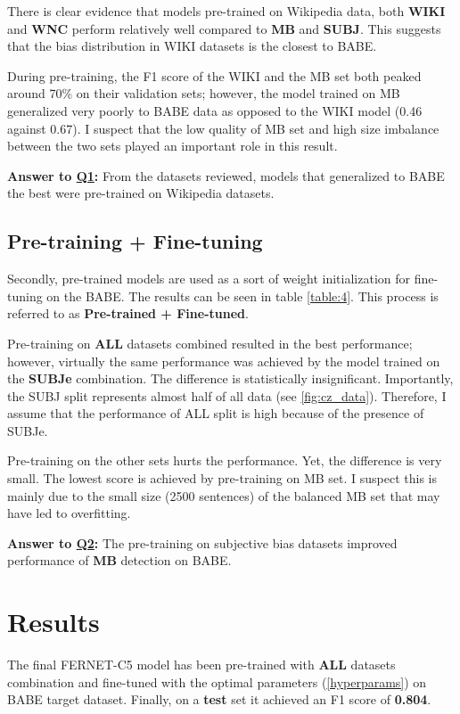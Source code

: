 There is clear evidence that models pre-trained on Wikipedia data, both \textbf{WIKI} and \textbf{WNC} perform relatively well compared to \textbf{MB} and \textbf{SUBJ}. This suggests that the bias distribution in WIKI datasets is the closest to BABE.

During pre-training, the F1 score of the WIKI and the MB set both peaked around 70\% on their validation sets; however, the model trained on MB generalized very poorly to BABE data as opposed to the WIKI model (0.46 against 0.67). I suspect that the low quality of MB set and high size imbalance between the two sets played an important role in this result.

\vspace{5mm}

\noindent \textbf{Answer to \hyperref[Q1]{Q1}:}
From the datasets reviewed, models that generalized to BABE the best were pre-trained on Wikipedia datasets.

\subsection{Pre-training + Fine-tuning}
Secondly, pre-trained models are used as a sort of weight initialization for fine-tuning on the BABE. The results can be seen in table \ref{table:4}. This process is referred to as \textbf{Pre-trained + Fine-tuned}.

Pre-training on \textbf{ALL} datasets combined resulted in the best performance; however, virtually the same performance was achieved by the model trained on the \textbf{SUBJe} combination. The difference is statistically insignificant. Importantly, the SUBJ split represents almost half of all data (see \ref{fig:cz_data}). Therefore, I assume that the performance of ALL split is high because of the presence of SUBJe.

Pre-training on the other sets hurts the performance. Yet, the difference is very small. The lowest score is achieved by pre-training on MB set. I suspect this is mainly due to the small size (2500 sentences) of the balanced MB set that may have led to overfitting.

\vspace{5mm}

\noindent \textbf{Answer to \hyperref[Q2]{Q2}:}
The pre-training on subjective bias datasets improved performance of \textbf{MB} detection on BABE.




\section{Results}
The final FERNET-C5 model has been pre-trained with \textbf{ALL} datasets combination and fine-tuned with the optimal parameters (\ref{hyperparams}) on BABE target dataset. Finally, on a \textbf{test} set it achieved an F1 score of \textbf{0.804}.

